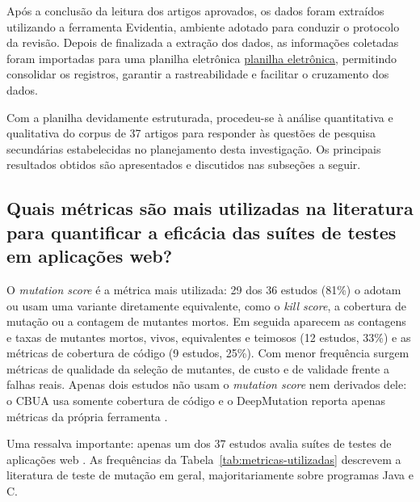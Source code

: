 Após a conclusão da leitura dos artigos aprovados, os dados foram extraídos utilizando a ferramenta Evidentia, ambiente adotado para conduzir o protocolo da revisão. Depois de finalizada a extração dos dados, as informações coletadas foram importadas para uma planilha eletrônica \href{https://docs.google.com/spreadsheets/d/1vhQH-s1NbXxbqH6Kie3z7ZXoASvZnZw09Wph0cionCQ/edit?usp=sharing}{planilha eletrônica}, permitindo consolidar os registros, garantir a rastreabilidade e facilitar o cruzamento dos dados.

Com a planilha devidamente estruturada, procedeu-se à análise quantitativa e qualitativa do corpus de 37 artigos para responder às questões de pesquisa secundárias estabelecidas no planejamento desta investigação. Os principais resultados obtidos são apresentados e discutidos nas subseções a seguir.

\subsection[Quais métricas são mais utilizadas na literatura?]{Quais métricas são mais utilizadas na literatura para quantificar 
a eficácia das suítes de testes em aplicações web?}
\label{subsec:metricas-utilizadas}

O \textit{mutation score} é a métrica mais utilizada: 29 dos 36 estudos (81\%) o adotam ou usam uma variante diretamente equivalente, como o \textit{kill score}, a cobertura de mutação ou a contagem de mutantes mortos. Em seguida aparecem as contagens e taxas de mutantes mortos, vivos, equivalentes e teimosos (12 estudos, 33\%) e as métricas de cobertura de código (9 estudos, 25\%). Com menor frequência surgem métricas de qualidade da seleção de mutantes, de custo e de validade frente a falhas reais. Apenas dois estudos não usam o \textit{mutation score} nem derivados dele: o CBUA usa somente cobertura de código \cite{zhang2022} e o DeepMutation reporta apenas métricas da própria ferramenta \cite{tufano2020}.

Uma ressalva importante: apenas um dos 37 estudos avalia suítes de testes de aplicações web \cite{yandrapally2021}. As frequências da Tabela~\ref{tab:metricas-utilizadas} descrevem a literatura de teste de mutação em geral, majoritariamente sobre programas Java e C. 

